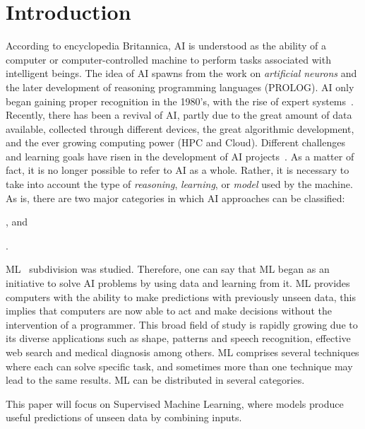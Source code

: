 
\section{Introduction}
\label{sec:introduction}

According to encyclopedia Britannica, \ac{AI} is understood as the ability of a computer or 
computer-controlled machine to perform tasks associated with intelligent beings. The idea of 
\ac{AI} spawns from the work on \textit{artificial neurons} and the later development of reasoning 
programming languages (\eg PROLOG). \ac{AI} only began gaining proper recognition in the 
1980's, with the rise of expert systems~\cite{russel09}.  Recently, there has been a revival of 
\ac{AI}, partly due to the great amount of data available, collected through different devices, the 
great algorithmic development, and the ever growing computing power (\ie \ac{HPC} and Cloud). 
Different challenges and learning goals have risen in the development of \ac{AI} 
projects~\cite{russel09}. As a matter of fact, it is no longer possible to refer to \ac{AI} as a whole. 
Rather, it is necessary to take into account the type of \emph{reasoning}, \emph{learning}, or \emph{model} used by the machine. As is, there are two major categories in which \ac{AI} approaches can be classified:
\begin{enumerate*}[label=(\arabic*)]
\item {}, and
\item .
\end{enumerate*}

\ac{ML}~\cite{watkins92} subdivision was studied. Therefore, one can say that \ac{ML} began as an initiative to solve AI problems by using data and learning from it. ML provides computers with the ability to make predictions with previously unseen data, this implies that computers are now able to act and make decisions without the intervention of a programmer. This broad field of study is rapidly growing due to its diverse applications such as shape, patterns and speech recognition, effective web search and medical diagnosis among others. ML comprises several techniques where each can solve specific task, and sometimes more than one technique may lead to the same results. ML can be distributed in several categories.

This paper will focus on Supervised Machine Learning, where models produce useful predictions of unseen data by combining inputs.  


